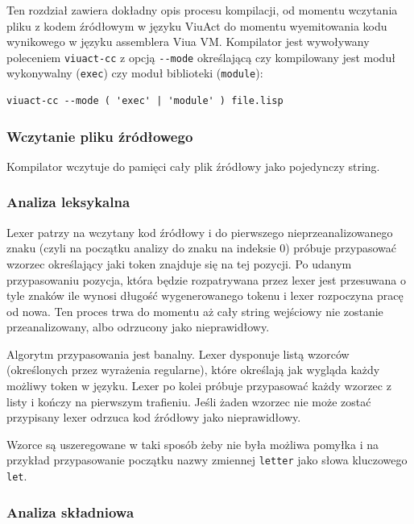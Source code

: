 \documentclass[11pt,oneside,a4paper,titlepage,onecolumn]{article}
\begin{document}
Ten rozdział zawiera dokładny opis procesu kompilacji, od momentu wczytania pliku z kodem źródłowym w języku
ViuAct do momentu wyemitowania kodu wynikowego w języku assemblera Viua VM. Kompilator jest wywoływany
poleceniem \texttt{viuact-cc} z opcją \texttt{-}\texttt{-mode} określającą czy kompilowany jest moduł wykonywalny
(\texttt{exec}) czy moduł biblioteki (\texttt{module}):

\begin{lstlisting}
viuact-cc --mode ( 'exec' | 'module' ) file.lisp
\end{lstlisting}

\subsubsection{Wczytanie pliku źródłowego}

Kompilator wczytuje do pamięci cały plik źródłowy jako pojedynczy string.

\subsubsection{Analiza leksykalna}

Lexer patrzy na wczytany kod źródłowy i do pierwszego nieprzeanalizowanego znaku (czyli na początku analizy do
znaku na indeksie 0) próbuje przypasować wzorzec określający jaki token znajduje się na tej pozycji. Po udanym
przypasowaniu pozycja, która będzie rozpatrywana przez lexer jest przesuwana o tyle znaków ile wynosi długość
wygenerowanego tokenu i lexer rozpoczyna pracę od nowa. Ten proces trwa do momentu aż cały string wejściowy
nie zostanie przeanalizowany, albo odrzucony jako nieprawidłowy.

Algorytm przypasowania jest banalny. Lexer dysponuje listą wzorców (określonych przez wyrażenia regularne),
które określają jak wygląda każdy możliwy token w języku. Lexer po kolei próbuje przypasować każdy wzorzec z
listy i kończy na pierwszym trafieniu. Jeśli żaden wzorzec nie może zostać przypisany lexer odrzuca kod
źródłowy jako nieprawidłowy.

Wzorce są uszeregowane w taki sposób żeby nie była możliwa pomyłka i
na przykład przypasowanie początku nazwy zmiennej \texttt{letter} jako słowa kluczowego \texttt{let}.

\subsubsection{Analiza składniowa}
\label{opis_etapow_kompilacji_analiza_skladniowa}
\end{document}
